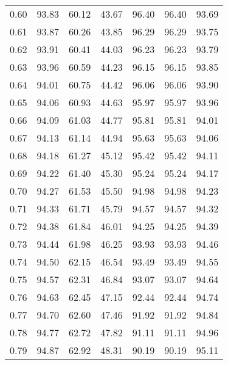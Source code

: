 \begin{tabular}{|c|c|c|c|c|c|c|}
      0.60 &     93.83 &     60.12 &      43.67 &   96.40 &      96.40 &         93.69 \\
      0.61 &     93.87 &     60.26 &      43.85 &   96.29 &      96.29 &         93.75 \\
      0.62 &     93.91 &     60.41 &      44.03 &   96.23 &      96.23 &         93.79 \\
      0.63 &     93.96 &     60.59 &      44.23 &   96.15 &      96.15 &         93.85 \\
      0.64 &     94.01 &     60.75 &      44.42 &   96.06 &      96.06 &         93.90 \\
      0.65 &     94.06 &     60.93 &      44.63 &   95.97 &      95.97 &         93.96 \\
      0.66 &     94.09 &     61.03 &      44.77 &   95.81 &      95.81 &         94.01 \\
      0.67 &     94.13 &     61.14 &      44.94 &   95.63 &      95.63 &         94.06 \\
      0.68 &     94.18 &     61.27 &      45.12 &   95.42 &      95.42 &         94.11 \\
      0.69 &     94.22 &     61.40 &      45.30 &   95.24 &      95.24 &         94.17 \\
      0.70 &     94.27 &     61.53 &      45.50 &   94.98 &      94.98 &         94.23 \\
      0.71 &     94.33 &     61.71 &      45.79 &   94.57 &      94.57 &         94.32 \\
      0.72 &     94.38 &     61.84 &      46.01 &   94.25 &      94.25 &         94.39 \\
      0.73 &     94.44 &     61.98 &      46.25 &   93.93 &      93.93 &         94.46 \\
      0.74 &     94.50 &     62.15 &      46.54 &   93.49 &      93.49 &         94.55 \\
      0.75 &     94.57 &     62.31 &      46.84 &   93.07 &      93.07 &         94.64 \\
      0.76 &     94.63 &     62.45 &      47.15 &   92.44 &      92.44 &         94.74 \\
      0.77 &     94.70 &     62.60 &      47.46 &   91.92 &      91.92 &         94.84 \\
      0.78 &     94.77 &     62.72 &      47.82 &   91.11 &      91.11 &         94.96 \\
      0.79 &     94.87 &     62.92 &      48.31 &   90.19 &      90.19 &         95.11 \\

\end{tabular}
